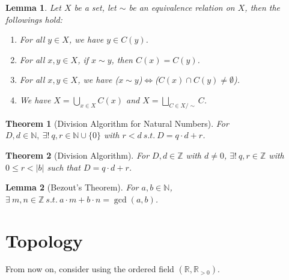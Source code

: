\documentclass[11pt]{article}
\theoremstyle{break}
\theoremstyle{break}
\newtheorem{thm}{Theorem}[section]
\newtheorem{lem}{Lemma}[thm]
\newcommand{\R}{\mathbb{R}}
\newcommand{\N}{\mathbb{N}}
\newcommand{\Z}{\mathbb{Z}}
\begin{document}
	
	
	
	
	
	
	\begin{lem}	
		Let $X$ be a set, let $\sim$ be an equivalence relation on $X$, then the followings hold:
		\begin{enumerate}[topsep=3pt,itemsep=-1ex,partopsep=1ex,parsep=1ex]
			\item For all $y \in X$, we have $y \in C(y)$.
			\item For all $x,y \in X$, if $x \sim y$, then $C(x)=C(y)$.
			\item For all $x,y \in X$, we have ($x \sim y$)$\iff$($C(x) \cap C(y) \neq \emptyset$).
			\item We have $X = \bigcup_{x \in X} C(x)$ and $X=\bigsqcup_{C \in X/{\sim}} C$.
		\end{enumerate}
	\end{lem}
	
	\begin{thm}[Division Algorithm for Natural Numbers]
		For $D,d \in \N, \ \exists! \ q,r \in \N \cup \{0 \}$ with $r<d \ s.t. \ D=q \cdot d +r$.
	\end{thm}
	
	\begin{thm}[Division Algorithm]
		For $D,d \in \Z$ with $d \neq 0$, $\exists! \ q,r \in \Z$ with $0 \leq r <|b|$ such that $D=q \cdot d + r$.
	\end{thm}
	
	\begin{lem}[Bezout's Theorem]
		For $a,b \in \N$, $\exists \ m,n \in \Z \ s.t. \ a \cdot m + b \cdot n = \gcd(a,b)$.
	\end{lem}	

\clearpage















\section{\color{red} Topology}
	\color{red} \noindent From now on, consider using the ordered field $(\R,\R_{>0})$. \color{black}
\end{document}
